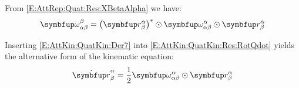 From \eqref{E:AttRep:Quat:Res:XBetaAlpha} we have:
\begin{equation} \label{E:AttKin:QuatKin:Der7}
	 \relprj{\quat{\omega}}{\alpha}{\beta}{\beta} = \RotQcon{\alpha}{\beta} \qprod
	 \relprj{\quat{\omega}}{\alpha}{\beta}{\alpha} \qprod \RotQ{\alpha}{\beta}
\end{equation}

Inserting \eqref{E:AttKin:QuatKin:Der7} into \eqref{E:AttKin:QuatKin:Res:RotQdot} yields the alternative form of the kinematic equation:
\begin{equation}
	\RotQdot{\alpha}{\beta} = \dfrac{1}{2} \relprj{\quat{\omega}}{\alpha}{\beta}{\alpha} \qprod \RotQ{\alpha}{\beta} 
\end{equation}


\endinput

